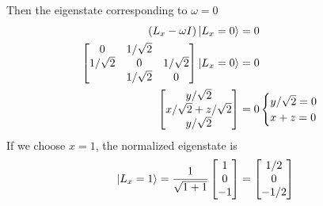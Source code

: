\documentclass[../../../main.tex]{subfiles}
\begin{document}
Then the eigenstate corresponding to $\omega=0$
\begin{align*}
    \left( L_x -\omega I  \right) \ket{L_x=0}&= 0\\
    \begin{bmatrix}
        0& 1/\sqrt{2 }& \\
        1/\sqrt{2}&0 &1/\sqrt{2} \\
        & 1/\sqrt{2}&0 \\
    \end{bmatrix}
    \ket{L_x=0}&= 0\\
    \begin{bmatrix}
        y/\sqrt{2}\\
        x/\sqrt{2 }+z/\sqrt{2 }\\
        y/\sqrt{2}
    \end{bmatrix}
    &= 0
    \begin{cases}
        y/\sqrt{2}=0\\
        x+z=0
    \end{cases}
\end{align*}
If we choose $x=1$, the normalized eigenstate is
\begin{equation*}
    \ket{L_x=1}=
    \frac{1}{\sqrt{1+1}}
    \begin{bmatrix}
        1\\
        0\\
        -1\\
    \end{bmatrix}
    =
        \begin{bmatrix}
        1/2\\
        0\\
        -1/2\\
    \end{bmatrix}
\end{equation*}
\end{document}
